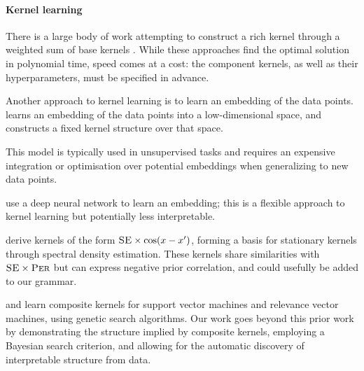 \documentclass[twoside]{article}
\renewcommand{\fTBD}[1]{}
\renewcommand{\NA}[1]{#1}  %
\begin{document}
\paragraph{Kernel learning}
There is a large body of work attempting to construct a rich kernel through a weighted sum of base kernels \citep[e.g.][]{christoudias2009bayesian, Bach_HKL}.\fTBD{Cite more}
While these approaches find the optimal solution in polynomial time, speed comes at a cost: the component kernels, as well as their hyperparameters, must be specified in advance.

Another approach to kernel learning is to learn an embedding of the data points. 
\citet{lawrence2005probabilistic} learns an embedding of the data points into a low-dimensional space, and constructs a fixed kernel structure over that space.
\NA{
This model is typically used in unsupervised tasks and requires an expensive integration or optimisation over potential embeddings when generalizing to new data points.
}
\citet{salakhutdinov2008using} use a deep neural network to learn an embedding; this is a flexible approach to kernel learning but potentially less interpretable.

\citet{WilAda13} derive kernels of the form ${\textsc{SE} \times \cos(x-x')}$, forming a basis for stationary kernels through spectral density estimation.
These kernels share similarities with ${{\textsc{SE}} \times {\textsc{Per}}}$ but can express negative prior correlation, and could usefully be added to our grammar.

\citet{diosan2007evolving} and \citet{bing2010gp} learn composite kernels for support vector machines and relevance vector machines, using genetic search algorithms.
Our work goes beyond this prior work by demonstrating the structure implied by composite kernels, employing a Bayesian search criterion, and allowing for the automatic discovery of interpretable structure from data.
\end{document}
